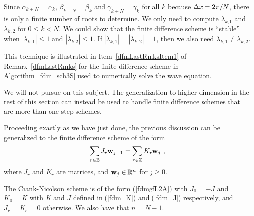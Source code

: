 \begin{rmk}
Since $\alpha_{k+N} = \alpha_k$, $\beta_{k+N} = \beta_k$ and
$\gamma_{k+N} = \gamma_k$ for all $k$ because $\Delta{x} = 2\pi/N$,
there is only a finite number of roots to determine.  We
only need to compute $\lambda_{k,1}$ and $\lambda_{k,2}$ for
$0 \leq k < N$.
We could show that the finite difference scheme is ``stable'' when
$|\lambda_{k,1}| \leq 1$ and $|\lambda_{k,2}| \leq 1$.  If
$|\lambda_{k,1}| = |\lambda_{k,2}|=1$, then we also need
$\lambda_{k,1} \neq \lambda_{k,2}$.

This technique is illustrated in Item~\ref{dfmLastRmksItem1} of
Remark~\ref{dfmLastRmks} for the finite difference
scheme in Algorithm~\ref{fdm_sch3S} used to numerically solve the wave
equation.

We will not pursue on this subject.  The generalization to higher
dimension in the rest of this section can instead be used to handle
finite difference schemes that are more than one-step schemes.
\end{rmk}

Proceeding exactly as we have just done, the previous discussion can
be generalized to the finite difference scheme of the form
\begin{equation} \label{fdmgfL2D}
\sum_{r\in \ZZ} J_r \VEC{w}_{j+1} = \sum_{r\in \ZZ} K_r \VEC{w}_j \ ,
\end{equation}
where $J_r$ and $K_r$ are \nn matrices, and $\mathbf{w}_j \in \mathbb{R}^n$ for
$j\geq 0$.

\begin{egg}
The Crank-Nicolson scheme is of the form (\ref{fdmgfL2A}) with
$J_0 = -J$ and $K_0 = K$ with $K$ and $J$ defined in (\ref{fdm_K}) and
(\ref{fdm_J}) respectively, and $J_r=K_r= 0$ otherwise.  We also have
that $n= N-1$.
\end{egg}

